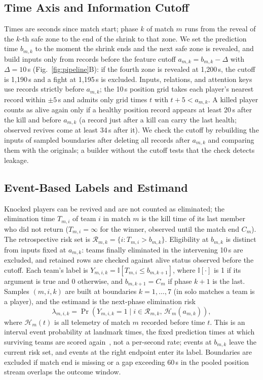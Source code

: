 \documentclass[sigconf,anonymous]{acmart}
\begin{document}
\subsection{Time Axis and Information Cutoff}
\label{sec:method:samples}
Times are seconds since match start; phase $k$ of match $m$ runs from the reveal of the $k$-th safe zone to the end of the shrink to that zone.
We set the prediction time $b_{m,k}$ to the moment the shrink ends and the next safe zone is revealed, and build inputs only from records before the feature cutoff $a_{m,k}=b_{m,k}-\Delta$ with $\Delta=10$\,s (Fig.~\ref{fig:pipeline}B): if the fourth zone is revealed at 1,200\,s, the cutoff is 1,190\,s and a fight at 1,195\,s is excluded. Inputs, relations, and attention keys use records strictly before $a_{m,k}$; the 10\,s position grid takes each player's nearest record within $\pm5$\,s and admits only grid times $t$ with $t+5<a_{m,k}$.
A killed player counts as alive again only if a healthy position record appears at least 20\,s after the kill and before $a_{m,k}$ (a record just after a kill can carry the last health; observed revives come at least 34\,s after it).
We check the cutoff by rebuilding the inputs of sampled boundaries after deleting all records after $a_{m,k}$ and comparing them with the originals; a builder without the cutoff tests that the check detects leakage.

\subsection{Event-Based Labels and Estimand}
\label{sec:method:labels}
Knocked players can be revived and are not counted as eliminated; the elimination time $T_{m,i}$ of team $i$ in match $m$ is the kill time of its last member who did not return ($T_{m,i}=\infty$ for the winner, observed until the match end $C_m$).
The retrospective risk set is $\mathcal{R}_{m,k}=\{i:T_{m,i}>b_{m,k}\}$. Eligibility at $b_{m,k}$ is distinct from inputs fixed at $a_{m,k}$: teams finally eliminated in the intervening 10\,s are excluded, and retained rows are checked against alive status observed before the cutoff.
Each team's label is $Y_{m,i,k}=\mathbb{I}[T_{m,i}\le b_{m,k+1}]$, where $\mathbb{I}[\cdot]$ is 1 if its argument is true and 0 otherwise, and $b_{m,k+1}=C_m$ if phase $k+1$ is the last.
Samples $(m,i,k)$ are built at boundaries $k=1,\dots,7$ (in solo matches a team is a player), and the estimand is the next-phase elimination risk
\begin{equation}
\lambda_{m,i,k}=\Pr\!\left(Y_{m,i,k}=1 \mid i\in\mathcal{R}_{m,k},\,\mathcal{H}_{m}(a_{m,k})\right),
\label{eq:hazard}
\end{equation}
where $\mathcal{H}_{m}(t)$ is all telemetry of match $m$ recorded before time $t$.
This is an interval event probability at landmark times, the fixed prediction times at which surviving teams are scored again~\cite{vanHouwelingen07}, not a per-second rate; events at $b_{m,k}$ leave the current risk set, and events at the right endpoint enter its label. Boundaries are excluded if match end is missing or a gap exceeding 60\,s in the pooled position stream overlaps the outcome window.
\end{document}

